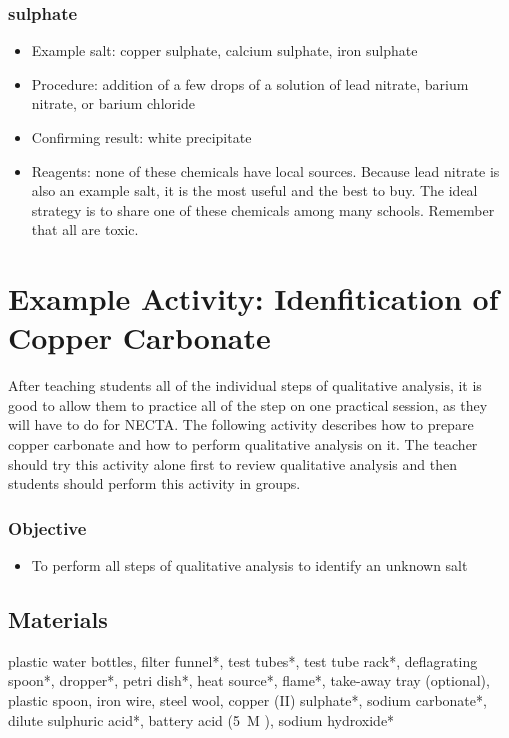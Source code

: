 \subsubsection{sulphate}
\begin{itemize}
\item{Example salt: copper sulphate, 
calcium sulphate, 
iron sulphate}
\item{Procedure: addition of a few drops of a solution of lead nitrate, 
barium nitrate, 
or barium chloride}
\item{Confirming result: white precipitate}
\item{Reagents: none of these chemicals have local sources. 
Because lead nitrate is also an example salt, 
it is the most useful and the best to buy. 
The ideal strategy is to share one of these chemicals among many schools. 
Remember that all are toxic.}
\end{itemize}

\section{Example Activity: Idenfitication of Copper Carbonate}

After teaching students all of the individual steps of qualitative analysis, it is good to allow them to practice all of the step on one practical session, as they will have to do for NECTA. The following activity describes how to prepare copper carbonate and how to perform qualitative analysis on it. The teacher should try this activity alone first to review qualitative analysis and then students should perform this activity in groups.

\subsubsection{Objective}
\begin{itemize}
\item{To perform all steps of qualitative analysis to identify an unknown salt}
\end{itemize}

\subsection{Materials}
plastic water bottles, filter funnel*, test tubes*, test tube rack*, deflagrating spoon*, dropper*, petri dish*, heat source*, flame*, take-away tray (optional), plastic spoon, iron wire, steel wool, copper (II) sulphate*, sodium carbonate*, dilute sulphuric acid*, battery acid (5~M ), sodium hydroxide*

